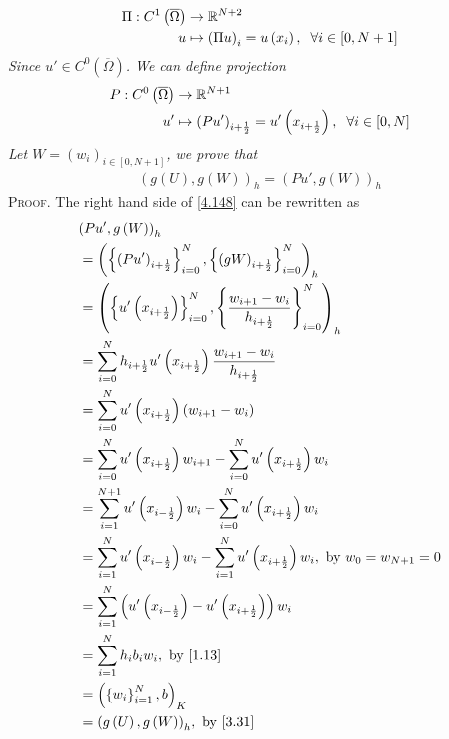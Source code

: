 \documentclass[a4paper]{article}
\numberwithin{equation}{section}
\begin{document}
\begin{align}
\Pi :{C^1}\left( {\overline \Omega  } \right) &\to {\mathbb{R}^{N + 2}}\\
u &\mapsto {\left( {\Pi u} \right)_i} = u\left( {{x_i}} \right),\hspace{0.2cm}\forall i \in \left[ {0,N + 1} \right]
\end{align}
\textit{Since $u'\in C^0\left(\overline{\Omega}\right)$. We can define projection}
\begin{align}
P:{C^0}\left( {\overline \Omega  } \right) &\to {\mathbb{R}^{N + 1}}\\
u' &\mapsto {\left( {Pu'} \right)_{i + \frac{1}{2}}} = u'\left( {{x_{i + \frac{1}{2}}}} \right),\hspace{0.2cm}\forall i \in \left[ {0,N} \right]
\end{align}
\textit{Let $W={\left( {{w_i}} \right)_{i \in \left[ {0,N + 1} \right]}}$, we prove that}
\begin{align}
\label{4.148}
{\left( {g\left( U \right),g\left( W \right)} \right)_h} = {\left( {Pu',g\left( W \right)} \right)_h}
\end{align}
\textsc{Proof.} The right hand side of \eqref{4.148} can be rewritten as
\begin{align}
& {\left( {Pu',g\left( W \right)} \right)_h}\\
&= {\left( {\left\{ {{{\left( {Pu'} \right)}_{i + \frac{1}{2}}}} \right\}_{i = 0}^N,\left\{ {{{\left( {gW} \right)}_{i + \frac{1}{2}}}} \right\}_{i = 0}^N} \right)_h}\\
 &= {\left( {\left\{ {u'\left( {{x_{i + \frac{1}{2}}}} \right)} \right\}_{i = 0}^N,\left\{ {\frac{{{w_{i + 1}} - {w_i}}}{{{h_{i + \frac{1}{2}}}}}} \right\}_{i = 0}^N} \right)_h}\\
 &= \sum\limits_{i = 0}^N {{h_{i + \frac{1}{2}}}u'\left( {{x_{i + \frac{1}{2}}}} \right)\frac{{{w_{i + 1}} - {w_i}}}{{{h_{i + \frac{1}{2}}}}}} \\
 &= \sum\limits_{i = 0}^N {u'\left( {{x_{i + \frac{1}{2}}}} \right)\left( {{w_{i + 1}} - {w_i}} \right)} \\
 &= \sum\limits_{i = 0}^N {u'\left( {{x_{i + \frac{1}{2}}}} \right){w_{i + 1}}}  - \sum\limits_{i = 0}^N {u'\left( {{x_{i + \frac{1}{2}}}} \right){w_i}} \\
 &= \sum\limits_{i = 1}^{N + 1} {u'\left( {{x_{i - \frac{1}{2}}}} \right){w_i}}  - \sum\limits_{i = 0}^N {u'\left( {{x_{i + \frac{1}{2}}}} \right){w_i}} \\
 &= \sum\limits_{i = 1}^N {u'\left( {{x_{i - \frac{1}{2}}}} \right){w_i}}  - \sum\limits_{i = 1}^N {u'\left( {{x_{i + \frac{1}{2}}}} \right){w_i}} ,\mbox{ by } {w_0} = {w_{N + 1}} = 0\\
 &= \sum\limits_{i = 1}^N {\left( {u'\left( {{x_{i - \frac{1}{2}}}} \right) - u'\left( {{x_{i + \frac{1}{2}}}} \right)} \right){w_i}} \\
 &= \sum\limits_{i = 1}^N {{h_i}{b_i}{w_i}} ,\mbox{ by \eqref{1.13}}\\
 &= {\left( {\left\{ {{w_i}} \right\}_{i = 1}^N,b} \right)_K}\\
 &= {\left( {g\left( U \right),g\left( W \right)} \right)_h},\mbox{ by \eqref{3.31}}
\end{align}
\end{document}
